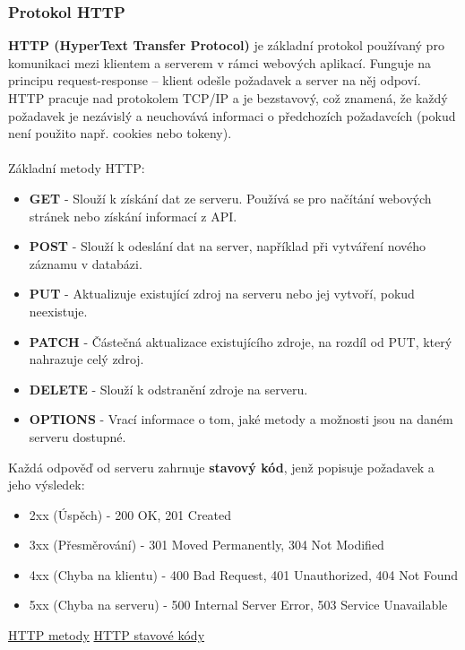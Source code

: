 \subsubsection{Protokol HTTP}
\textbf{HTTP (HyperText Transfer Protocol)} je základní protokol používaný pro komunikaci mezi klientem a serverem v rámci webových aplikací. Funguje na principu request-response – klient odešle požadavek a server na něj odpoví. HTTP pracuje nad protokolem TCP/IP a je bezstavový, což znamená, že každý požadavek je nezávislý a neuchovává informaci o předchozích požadavcích (pokud není použito např. cookies nebo tokeny). \\\\
Základní metody HTTP:
\begin{itemize}
    \item \textbf{GET} - Slouží k získání dat ze serveru. Používá se pro načítání webových stránek nebo získání informací z API.
    \item \textbf{POST} - Slouží k odeslání dat na server, například při vytváření nového záznamu v databázi.
    \item \textbf{PUT} - Aktualizuje existující zdroj na serveru nebo jej vytvoří, pokud neexistuje.
    \item \textbf{PATCH} - Částečná aktualizace existujícího zdroje, na rozdíl od PUT, který nahrazuje celý zdroj.
    \item \textbf{DELETE} - Slouží k odstranění zdroje na serveru.
    \item \textbf{OPTIONS} - Vrací informace o tom, jaké metody a možnosti jsou na daném serveru dostupné.
\end{itemize}
\newpage
Každá odpověď od serveru zahrnuje \textbf{stavový kód}, jenž popisuje požadavek a jeho výsledek:
\begin{itemize}
    \item 2xx (Úspěch) - 200 OK, 201 Created
    \item 3xx (Přesměrování) - 301 Moved Permanently, 304 Not Modified
    \item 4xx (Chyba na klientu) - 400 Bad Request, 401 Unauthorized, 404 Not Found
    \item 5xx (Chyba na serveru) - 500 Internal Server Error, 503 Service Unavailable
\end{itemize}




\href{https://www.theserverside.com/blog/Coffee-Talk-Java-News-Stories-and-Opinions/HTTP-methods}{HTTP metody}
\href{https://developer.mozilla.org/en-US/docs/Web/HTTP/Reference/Status}{HTTP stavové kódy}